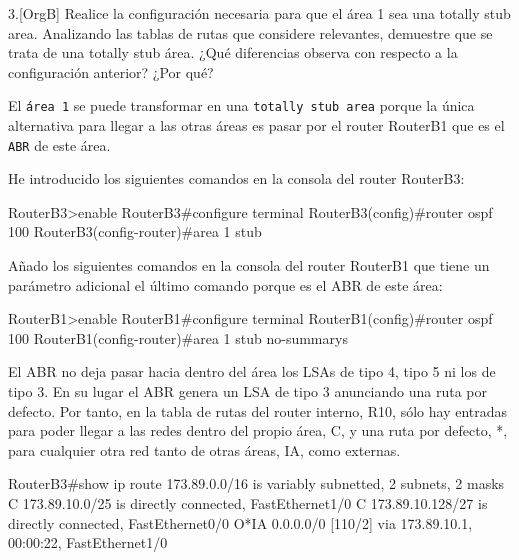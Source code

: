 \begin{ejer}
3.[OrgB] Realice la configuración necesaria para que el área 1 sea una totally stub area. Analizando las tablas de rutas que considere relevantes, demuestre que se trata de una totally stub área. ¿Qué diferencias observa con respecto a la configuración anterior? ¿Por qué?
\end{ejer}
\par El \texttt{área 1} se puede transformar en una \texttt{totally stub area} porque la única alternativa para llegar a las otras áreas es pasar por el router RouterB1 que es el \texttt{ABR} de este área.
\par He introducido los siguientes comandos en la consola del router RouterB3:

\begin{listing}[style=consola]
RouterB3>enable
RouterB3#configure terminal
RouterB3(config)#router ospf 100
RouterB3(config-router)#area 1 stub
\end{listing}

\par Añado los siguientes comandos en la consola del router RouterB1 que tiene un parámetro adicional el último comando porque es el ABR de este área:
\begin{listing}[style=consola]
RouterB1>enable
RouterB1#configure terminal
RouterB1(config)#router ospf 100
RouterB1(config-router)#area 1 stub no-summarys
\end{listing}
\par El ABR no deja pasar hacia dentro del área los LSAs de tipo 4, tipo 5 ni los de tipo 3. En su lugar el ABR genera un LSA de tipo 3 anunciando una ruta por defecto. Por tanto, en la tabla de rutas del router interno, R10, sólo hay entradas para poder llegar a las redes dentro del propio área, C, y una ruta por defecto, *, para cualquier otra red tanto de otras áreas, IA, como externas.
\begin{listing}[style=consola]
RouterB3#show ip route 
     173.89.0.0/16 is variably subnetted, 2 subnets, 2 masks
C       173.89.10.0/25 is directly connected, FastEthernet1/0
C       173.89.10.128/27 is directly connected, FastEthernet0/0
O*IA 0.0.0.0/0 [110/2] via 173.89.10.1, 00:00:22, FastEthernet1/0
\end{listing}